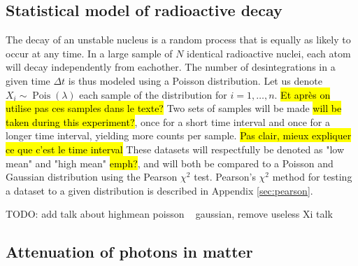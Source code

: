 \subsection{Statistical model of radioactive decay}
\label{sec:statistics}



The decay of an unstable nucleus is a random process that is equally as likely to occur at any time. 
In a large sample of \(N\) identical radioactive nuclei, each atom will decay independently from eachother. 
The number of desintegrations in a given time \(\Delta t\) is thus modeled using a Poisson distribution. 
Let us denote \(X_i \sim \operatorname{Pois}(\lambda)\) each sample of the distribution for \mbox{\(i = 1, \dots, n\)}.
\hl{Et après on utilise pas ces samples dans le texte?} 
Two sets of samples will be made \hl{will be taken during this experiment?}, once for a short time interval and once for a longer time interval, yielding more counts per sample. \hl{Pas clair, mieux expliquer ce que c'est le time interval}
These datasets will respectfully be denoted as "low mean" and "high mean" \hl{emph?}, and will both be compared to a Poisson and Gaussian distribution using the Pearson \(\chi^2\) test. 
Pearson's \(\chi^2\) method for testing a dataset to a given distribution is described in Appendix \ref{sec:pearson}. 

TODO: add talk about highmean poisson ~ gaussian, remove useless Xi talk

\subsection{Attenuation of photons in matter}
\label{sec:attenuation}


